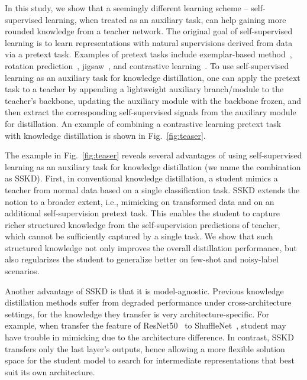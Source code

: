 \documentclass[runningheads]{llncs}
\newcommand{\ie}{i.e.}
\begin{document}
In this study, we show that a seemingly different learning scheme -- self-supervised learning, when treated as an auxiliary task, can help gaining more rounded knowledge from a teacher network. 
The original goal of self-supervised learning is to learn representations with natural supervisions derived from data via a pretext task. Examples of pretext tasks include exemplar-based method~\cite{exemplar}, rotation prediction~\cite{rot}, jigsaw~\cite{jigsaw}, and contrastive learning~\cite{SimCLR,PIRL}.
To use self-supervised learning as an auxiliary task for knowledge distillation, one can apply the pretext task to a teacher by appending a lightweight auxiliary branch/module to the teacher's backbone, updating the auxiliary module with the backbone frozen, and then extract the corresponding self-supervised signals from the auxiliary module for distillation.
An example of combining a contrastive learning pretext task~\cite{SimCLR} with knowledge distillation is shown in Fig.~\ref{fig:teaser}.


The example in Fig.~\ref{fig:teaser} reveals several advantages of using self-supervised learning as an auxiliary task for knowledge distillation (we name the combination as SSKD). First, in conventional knowledge distillation, a student mimics a teacher from normal data based on a single classification task.
SSKD extends the notion to a broader extent, \ie, mimicking on transformed data and on an additional self-supervision pretext task. This enables the student to capture richer structured knowledge from the self-supervision predictions of teacher, which cannot be sufficiently captured by a single task. We show that such structured knowledge not only improves the overall distillation performance, but also regularizes the student to generalize better on few-shot and noisy-label scenarios.

Another advantage of SSKD is that it is model-agnostic.
Previous knowledge distillation methods suffer from degraded performance under cross-architecture settings, for the knowledge they transfer is very architecture-specific. For example, when transfer the feature of ResNet50~\cite{resnet} to ShuffleNet~\cite{shufflenet}, student may have trouble in mimicking due to the architecture difference.
In contrast, SSKD transfers only the last layer's outputs, hence allowing a more flexible solution space for the student model to search for intermediate representations that best suit its own architecture.
\end{document}

